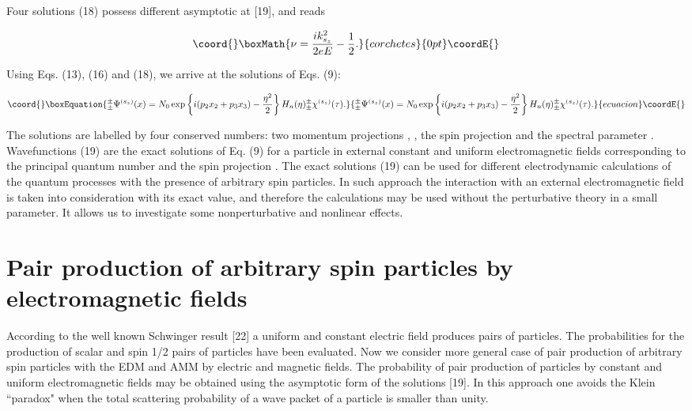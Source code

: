 \documentclass[a4paper,12pt]{article}
\begin{document}
Four solutions (18) possess different asymptotic at \coordHE{} [19], and \myHighlight{$\nu $}\coordHE{} reads

\[\coord{}\boxMath{
\nu =\frac{ik_{s_z}^2}{2eE}-\frac 12.
}{corchetes}{0pt}\coordE{}\]

Using Eqs. (13), (16) and (18), we arrive at the solutions of Eqs. (9):

\begin{equation}\coord{}\boxEquation{
_{\pm }^{\pm }\Psi ^{(s_z)}(x)=N_0\exp \left\{ i(p_2x_2+p_3x_3)-\frac{\eta
^2 }2\right\} H_n(\eta )_{\pm }^{\pm }\chi ^{(s_z)}(\tau ).  \label{19}
}{
_{\pm }^{\pm }\Psi ^{(s_z)}(x)=N_0\exp \left\{ i(p_2x_2+p_3x_3)-\frac{\eta
^2 }2\right\} H_n(\eta )_{\pm }^{\pm }\chi ^{(s_z)}(\tau ).  }{ecuacion}\coordE{}\end{equation}

The solutions \coordHE{} are labelled by four
conserved numbers: two momentum projections \coordHE{}, \coordHE{}, the spin
projection \coordHE{} and the spectral parameter \coordHE{}. Wavefunctions (19)
are the exact solutions of Eq. (9) for a particle in external constant and
uniform electromagnetic fields corresponding to the principal quantum number
\coordHE{} and the spin projection \coordHE{}. The exact solutions (19) can be used for
different electrodynamic calculations of the quantum processes with the
presence of arbitrary spin particles. In such approach the interaction with
an external electromagnetic field is taken into consideration with its exact
value, and therefore the calculations may be used without the perturbative
theory in a small parameter. It allows us to investigate some
nonperturbative and nonlinear effects.

\section{Pair production of arbitrary spin particles by
electromagnetic fields}

According to the well known Schwinger result [22] a uniform and constant
electric field produces pairs of particles. The probabilities for the
production of scalar and spin 1/2 pairs of particles have been evaluated.
Now we consider more general case of pair production of arbitrary spin
particles with the EDM and AMM by electric and magnetic fields. The
probability of pair production of particles by constant and uniform
electromagnetic fields may be obtained using the asymptotic form of the
solutions [19]. In this approach one avoids the Klein ``paradox" when the
total scattering probability of a wave packet of a particle is smaller than
unity.
\end{document}

